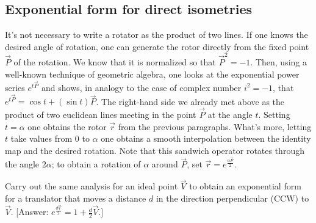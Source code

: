 \documentclass[12pt]{article}
\newcommand{\mydogblue}{{\color{gray} $\square$~~}}
\begin{document}
{\subsection{Exponential form for direct isometries}

It's not necessary to write a rotator as the product of two lines.  If one knows the desired angle of rotation, one can generate the rotor directly from the fixed point $\vec{P}$ of the rotation.   We know that it is normalized so that $\vec{P}^{2}=-1$.  Then, using a well-known technique of geometric algebra, one looks at the exponential power series $e^{t\vec{P}}$ and shows, in analogy to the case of complex number $i^{2}=-1$, that $e^{t\vec{P}} = \cos{t} + (\sin{t}) \vec{P}$. The right-hand side we already met above as the product of two euclidean lines meeting in the point $\vec{P}$ at the angle $t$.  Setting $t=\alpha$ one obtains the rotor $\vec{r}$ from the previous paragraphs.  What's more, letting $t$ take values from $0$ to $\alpha$ one obtains a smooth interpolation between the identity map and the desired rotation. Note that this sandwich operator rotates through the angle $2 \alpha$; to obtain a rotation of $\alpha$ around $\vec{P}$, set $\vec{r} = e^{\frac{\alpha \vec{P}}{2}}$. 

\myexercise  Carry out the same analysis for an ideal point $\vec{V}$ to obtain an exponential form for a translator that moves a distance $d$ in the direction perpendicular (CCW) to $\vec{V}$. [Answer: $e^{\frac{d \vec{V}}{2}} = 1+\frac{d}{2}\vec{V}$.] %
}
\end{document}
